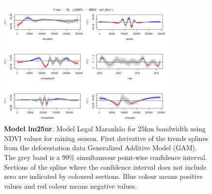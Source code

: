 \begin{table}

\begin{figure}[H]
 \centering
        \centering
        \includegraphics[width=0.8\textwidth]{ml25nr.png} %
        \caption[Model Legal Maranhão for 25km bandwidth using NDVI values for raining season. First derivative of the trends splines from the deforestation data Generalized Additive Model (GAM)]{\textbf{Model lm25nr}. Model Legal Maranhão for 25km bandwidth using NDVI values for raining season. First derivative of the trends splines from the deforestation data Generalized Additive Model (GAM). The grey band is a 99\% simultaneous point-wise confidence interval. Sections of the spline where the confidence interval does not include zero are indicated by coloured sections. Blue colour means positive values and red colour means negative values.}
        \centering
\end{figure}
\end{table}

